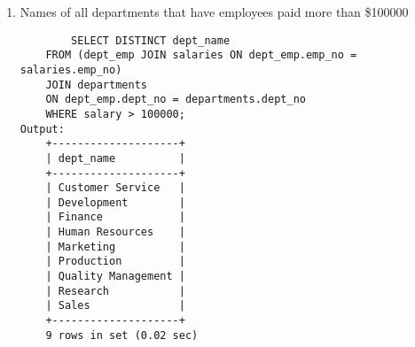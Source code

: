 \documentclass[12pt, letterpaper, twoside]{article}
\begin{document}
\begin{enumerate}
		\item Names of all departments that have employees paid more
than \$100000
		\begin{verbatim}
		SELECT DISTINCT dept_name
	FROM (dept_emp JOIN salaries ON dept_emp.emp_no = salaries.emp_no)
	JOIN departments
	ON dept_emp.dept_no = departments.dept_no
	WHERE salary > 100000;
Output: 
	+--------------------+
	| dept_name          |
	+--------------------+
	| Customer Service   |
	| Development        |
	| Finance            |
	| Human Resources    |
	| Marketing          |
	| Production         |
	| Quality Management |
	| Research           |
	| Sales              |
	+--------------------+
	9 rows in set (0.02 sec)

		\end{verbatim}
	\end{enumerate}
\end{document}

